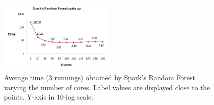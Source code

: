 \documentclass[3p,review]{elsarticle}
\begin{document}
	\begin{figure}[!htp]
		\centering
		\includegraphics[width=0.5\textwidth]{rf-spark}
		\caption{Average time (3 runnings) obtained by Spark's Random Forest varying the number of cores. Label values are displayed close to the points. Y-axis in 10-log scale.}
		\label{fig:rf-spark}
	\end{figure}
	
	
\end{document}

